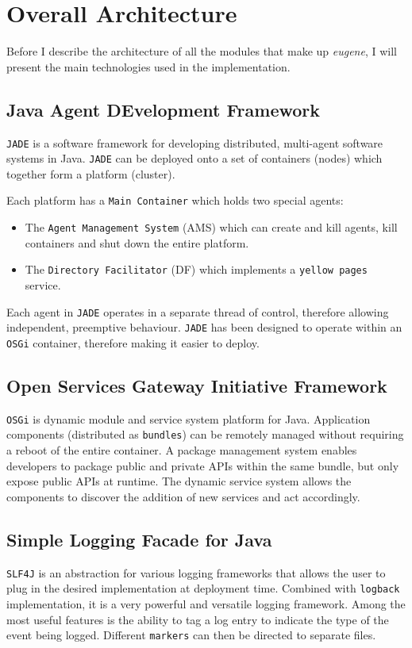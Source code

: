 \section{Overall Architecture}
Before I describe the architecture of all the modules that make up \textit{eugene}, I will present the main technologies used in the implementation.

\subsection{Java Agent DEvelopment Framework}
\texttt{JADE} is a software framework for developing distributed, multi-agent software systems in Java. \texttt{JADE} can be deployed onto a set of containers (nodes) which together form a platform (cluster).

Each platform has a \texttt{Main Container} which holds two special agents:
\begin{itemize}
\item The \texttt{Agent Management System} (AMS) which can create and kill agents, kill containers and shut down the entire platform.
\item The \texttt{Directory Facilitator} (DF) which implements a \texttt{yellow pages} service.
\end{itemize} 

Each agent in \texttt{JADE} operates in a separate thread of control, therefore allowing independent, preemptive behaviour. \texttt{JADE}  has been designed to operate within an \texttt{OSGi} container, therefore making it easier to deploy.

\subsection{Open Services Gateway Initiative Framework}
\texttt{OSGi} is dynamic module and service system platform for Java. Application components (distributed as \texttt{bundles}) can be remotely managed without requiring a reboot of the entire container. A package management system enables developers to package public and private APIs within the same bundle, but only expose public APIs at runtime. The dynamic service system allows the components to discover the addition of new services and act accordingly.

\subsection{Simple Logging Facade for Java}
\texttt{SLF4J} is an abstraction for various logging frameworks that allows the user to plug in the desired implementation at deployment time. Combined with \texttt{logback} implementation, it is a very powerful and versatile logging framework. Among the most useful features is the ability to tag a log entry to indicate the type of the event being logged. Different \texttt{markers} can then be directed to separate files.
